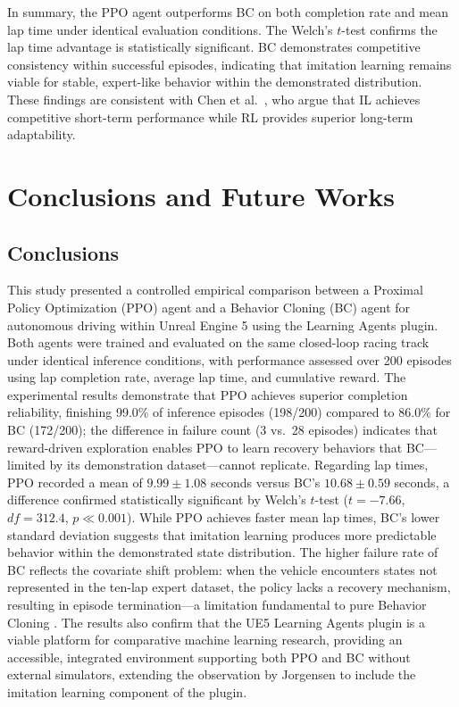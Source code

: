 \documentclass[conference]{IEEEtran}
\begin{document}
In summary, the PPO agent outperforms BC on both completion rate and mean lap time under identical evaluation conditions. The Welch's $t$-test confirms the lap time advantage is statistically significant. BC demonstrates competitive consistency within successful episodes, indicating that imitation learning remains viable for stable, expert-like behavior within the demonstrated distribution. These findings are consistent with Chen et al.\ \cite{chen2024endtoend}, who argue that IL achieves competitive short-term performance while RL provides superior long-term adaptability.
\lipsum[11]

\section{Conclusions and Future Works}
\label{sec:conclusions}

\subsection{Conclusions}

This study presented a controlled empirical comparison between a Proximal Policy Optimization (PPO) agent and a Behavior Cloning (BC) agent for autonomous driving within Unreal Engine 5 using the Learning Agents plugin. Both agents were trained and evaluated on the same closed-loop racing track under identical inference conditions, with performance assessed over 200 episodes using lap completion rate, average lap time, and cumulative reward. The experimental results demonstrate that PPO achieves superior completion reliability, finishing 99.0\% of inference episodes (198/200) compared to 86.0\% for BC (172/200); the difference in failure count (3 vs.\ 28 episodes) indicates that reward-driven exploration enables PPO to learn recovery behaviors that BC---limited by its demonstration dataset---cannot replicate. Regarding lap times, PPO recorded a mean of $9.99 \pm 1.08$ seconds versus BC's $10.68 \pm 0.59$ seconds, a difference confirmed statistically significant by Welch's $t$-test ($t = -7.66$, $df = 312.4$, $p \ll 0.001$). While PPO achieves faster mean lap times, BC's lower standard deviation suggests that imitation learning produces more predictable behavior within the demonstrated state distribution. The higher failure rate of BC reflects the covariate shift problem: when the vehicle encounters states not represented in the ten-lap expert dataset, the policy lacks a recovery mechanism, resulting in episode termination---a limitation fundamental to pure Behavior Cloning \cite{ross2011reduction}. The results also confirm that the UE5 Learning Agents plugin is a viable platform for comparative machine learning research, providing an accessible, integrated environment supporting both PPO and BC without external simulators, extending the observation by Jorgensen \cite{jorgensen2023killers} to include the imitation learning component of the plugin.
\end{document}
